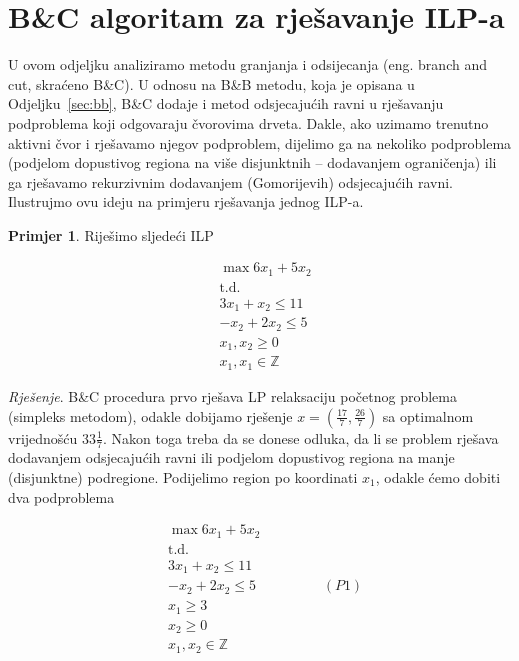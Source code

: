 \documentclass[a4paper, utf8, 11pt, colorlinks]{book}
\theoremstyle{definition}
\newtheorem{primjer}{Primjer}[chapter]
\begin{document}
\section{B\&C algoritam za rješavanje ILP-a}
U ovom odjeljku analiziramo metodu granjanja i odsijecanja (eng. branch and cut, skraćeno B\&C). U odnosu na B\&B metodu, koja je opisana u Odjeljku~\ref{sec:bb}, B\&C dodaje  i metod odsjecajućih ravni u rješavanju  podproblema koji odgovaraju čvorovima drveta. Dakle, ako  uzimamo trenutno aktivni čvor i rješavamo njegov podproblem, dijelimo ga na nekoliko podproblema (podjelom dopustivog regiona na više disjunktnih -- dodavanjem ograničenja) ili ga rješavamo rekurzivnim dodavanjem (Gomorijevih) odsjecajućih ravni. Ilustrujmo ovu ideju na primjeru rješavanja jednog ILP-a.

\begin{primjer} Riješimo sljedeći ILP
	\end{primjer}
\begin{align*}
    &\max 6 x_1 + 5 x_2 \\
    &  \mbox{t.d. } \\
    & 3x_1 + x_2 \leq 11 \\
    & - x_2 + 2 x_2 \leq 5 \\
    & x_1, x_2 \geq 0 \\
    & x_1, x_1 \in \mathbb{Z}
\end{align*}

\emph{Rješenje}. B\&C procedura prvo rješava LP relaksaciju početnog problema (simpleks metodom), odakle dobijamo rješenje $x=(\frac{17}{7}, \frac{26}{7})$
sa optimalnom vrijednošću $33\frac{1}{7}$. Nakon toga treba da se donese odluka, da li se problem rješava dodavanjem odsjecajućih ravni ili podjelom dopustivog regiona na manje (disjunktne) podregione. Podijelimo region po koordinati $x_1$, odakle ćemo dobiti dva podproblema 

\begin{align*}
    &\max 6 x_1 + 5 x_2 \\
     &  \mbox{t.d. } \\
    & 3x_1 + x_2 \leq 11 \\
    & - x_2 + 2 x_2 \leq 5 \hspace{2cm} (P1) \\
    & x_1 \geq 3 \\
    & x_2 \geq 0 \\
    & x_1, x_2 \in \mathbb{Z}
\end{align*}
\end{document}
